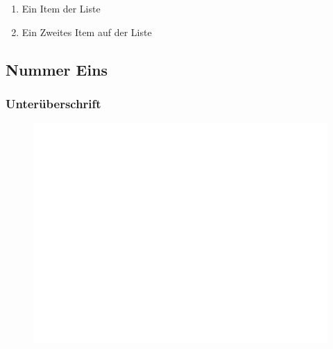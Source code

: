 \documentclass[12pt, a4paper, twoside, openany]{book}
\begin{document}
\begin{multicols}{2} %
        \Blindtext[1][1]
        \begin{enumerate}[label=\textbullet]
                \item Ein Item der Liste
                \item Ein Zweites Item auf der Liste
        \end{enumerate}

\subsection*{Nummer Eins}
\Blindtext[1][1]
\subsubsection*{Unterüberschrift}
\end{multicols}
\begin{figure}[H] %
        \centering
        \includegraphics[width=.6\textwidth]{bilder/foo.png}
        \label{fig:piel}
\end{figure}
\end{document}
